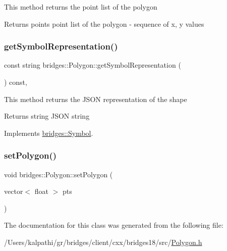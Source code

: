 This method returns the point list of the polygon

\begin{DoxyReturn}{Returns}
points point list of the polygon -\/ sequence of x, y values 
\end{DoxyReturn}
\mbox{\label{classbridges_1_1_polygon_a5c3e3bbeda23db712088278a3c82a0a6}} 
\subsubsection{\texorpdfstring{get\+Symbol\+Representation()}{getSymbolRepresentation()}}
{\footnotesize\ttfamily const string bridges\+::\+Polygon\+::get\+Symbol\+Representation (\begin{DoxyParamCaption}{ }\end{DoxyParamCaption}) const\hspace{0.3cm}{\ttfamily [inline]}, {\ttfamily [virtual]}}

This method returns the J\+S\+ON representation of the shape

\begin{DoxyReturn}{Returns}
string J\+S\+ON string 
\end{DoxyReturn}


Implements \mbox{\hyperlink{classbridges_1_1_symbol_ab4dd31fbc736b2e58e8b8bb8446eac73}{bridges\+::\+Symbol}}.

\mbox{\label{classbridges_1_1_polygon_a43ffa2f8767318c9c831dad9ed030679}} 
\subsubsection{\texorpdfstring{set\+Polygon()}{setPolygon()}}
{\footnotesize\ttfamily void bridges\+::\+Polygon\+::set\+Polygon (\begin{DoxyParamCaption}\item[{vector$<$ float $>$}]{pts }\end{DoxyParamCaption})\hspace{0.3cm}{\ttfamily [inline]}}



The documentation for this class was generated from the following file\+:\begin{DoxyCompactItemize}
\item 
/\+Users/kalpathi/gr/bridges/client/cxx/bridges18/src/\mbox{\hyperlink{_polygon_8h}{Polygon.\+h}}\end{DoxyCompactItemize}
